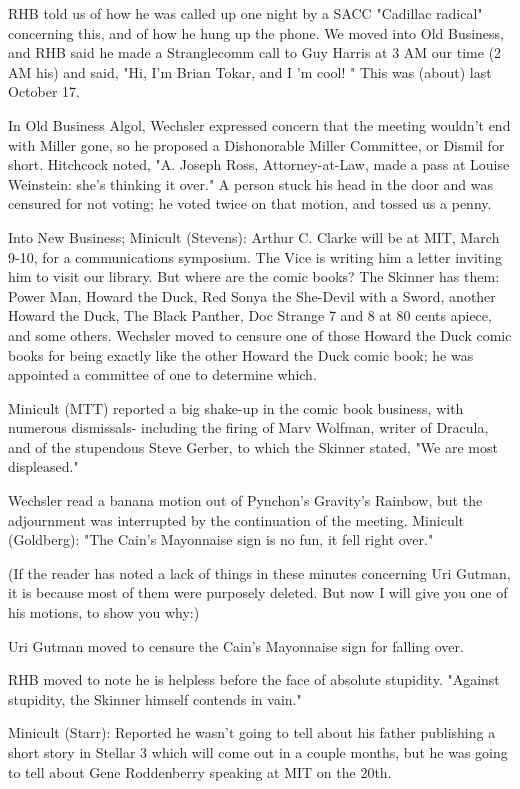 \documentclass[12pt]{article}
\begin{document}
RHB told us of how he was called up one night by a SACC "Cadillac radical" concerning this, and of how he hung up the phone. We moved into Old Business, and RHB said he made a Stranglecomm call to Guy Harris at 3 AM our time (2 AM his) and said, "Hi, I'm Brian Tokar, and I 'm cool! " This was (about) last October 17.

In Old Business Algol, Wechsler expressed concern that the meeting wouldn't end with Miller gone, so he proposed a Dishonorable Miller Committee, or Dismil for short. Hitchcock noted, "A. Joseph Ross, Attorney-at-Law, made a pass at Louise Weinstein: she's thinking it over." A person stuck his head in the door and was censured for not voting; he voted twice on that motion, and tossed us a penny.

Into New Business; Minicult (Stevens): Arthur C. Clarke will be at MIT, March 9-10, for a communications symposium. The Vice is writing him a letter inviting him to visit our library. But where are the comic books? The Skinner has them: Power Man, Howard the Duck, Red Sonya the She-Devil with a Sword, another Howard the Duck, The Black Panther, Doc Strange 7 and 8 at 80 cents apiece, and some others. Wechsler moved to censure one of those Howard the Duck comic books for being exactly like the other Howard the Duck comic book; he was appointed a committee of one to determine which.

Minicult (MTT) reported a big shake-up in the comic book business, with numerous dismissals- including the firing of Marv Wolfman, writer of Dracula, and of the stupendous Steve Gerber, to which the Skinner stated, "We are most displeased."

Wechsler read a banana motion out of Pynchon's Gravity's Rainbow, but the adjournment was interrupted by the continuation of the meeting. Minicult (Goldberg): "The Cain's Mayonnaise sign is no fun, it fell right over."

(If the reader has noted a lack of things in these minutes concerning Uri Gutman, it is because most of them were purposely deleted. But now I will give you one of his motions, to show you why:)

Uri Gutman moved to censure the Cain's Mayonnaise sign for falling over.

RHB moved to note he is helpless before the face of absolute stupidity. "Against stupidity, the Skinner himself contends in vain."

Minicult (Starr): Reported he wasn't going to tell about his
father publishing a short story in Stellar 3 which will come out in a couple months, but he was going to tell about Gene Roddenberry speaking at MIT on the 20th.
\end{document}
